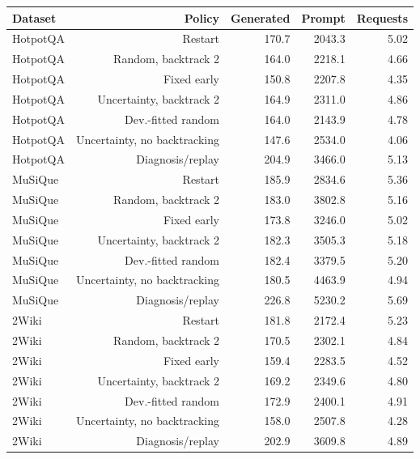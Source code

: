 \begin{tabular}{@{}lrrrr@{}}
\toprule
Dataset & Policy & Generated & Prompt & Requests \\
\midrule
HotpotQA & Restart & 170.7 & 2043.3 & 5.02 \\
HotpotQA & Random, backtrack 2 & 164.0 & 2218.1 & 4.66 \\
HotpotQA & Fixed early & 150.8 & 2207.8 & 4.35 \\
HotpotQA & Uncertainty, backtrack 2 & 164.9 & 2311.0 & 4.86 \\
HotpotQA & Dev.-fitted random & 164.0 & 2143.9 & 4.78 \\
HotpotQA & Uncertainty, no backtracking & 147.6 & 2534.0 & 4.06 \\
HotpotQA & Diagnosis/replay & 204.9 & 3466.0 & 5.13 \\
MuSiQue & Restart & 185.9 & 2834.6 & 5.36 \\
MuSiQue & Random, backtrack 2 & 183.0 & 3802.8 & 5.16 \\
MuSiQue & Fixed early & 173.8 & 3246.0 & 5.02 \\
MuSiQue & Uncertainty, backtrack 2 & 182.3 & 3505.3 & 5.18 \\
MuSiQue & Dev.-fitted random & 182.4 & 3379.5 & 5.20 \\
MuSiQue & Uncertainty, no backtracking & 180.5 & 4463.9 & 4.94 \\
MuSiQue & Diagnosis/replay & 226.8 & 5230.2 & 5.69 \\
2Wiki & Restart & 181.8 & 2172.4 & 5.23 \\
2Wiki & Random, backtrack 2 & 170.5 & 2302.1 & 4.84 \\
2Wiki & Fixed early & 159.4 & 2283.5 & 4.52 \\
2Wiki & Uncertainty, backtrack 2 & 169.2 & 2349.6 & 4.80 \\
2Wiki & Dev.-fitted random & 172.9 & 2400.1 & 4.91 \\
2Wiki & Uncertainty, no backtracking & 158.0 & 2507.8 & 4.28 \\
2Wiki & Diagnosis/replay & 202.9 & 3609.8 & 4.89 \\
\bottomrule
\end{tabular}
